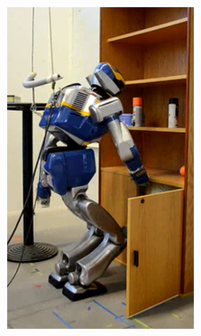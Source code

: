 \begin{figure}
\begin{subfigure}{0.19\columnwidth}
    \includegraphics[width = \columnwidth]
                    {src/chap3-optimal-motion-planning/figure/shelves-7.png}
    \label{shelves-7}
  \end{subfigure}
  \begin{subfigure}{0.19\columnwidth}
    \centering

\end{subfigure}
\end{figure}
